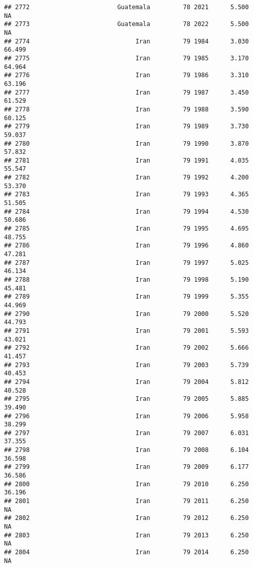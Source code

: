 \documentclass[
]{article}
\begin{document}
\begin{verbatim}
## 2772                        Guatemala         78 2021      5.500         NA
## 2773                        Guatemala         78 2022      5.500         NA
## 2774                             Iran         79 1984      3.030     66.499
## 2775                             Iran         79 1985      3.170     64.964
## 2776                             Iran         79 1986      3.310     63.196
## 2777                             Iran         79 1987      3.450     61.529
## 2778                             Iran         79 1988      3.590     60.125
## 2779                             Iran         79 1989      3.730     59.037
## 2780                             Iran         79 1990      3.870     57.832
## 2781                             Iran         79 1991      4.035     55.547
## 2782                             Iran         79 1992      4.200     53.370
## 2783                             Iran         79 1993      4.365     51.505
## 2784                             Iran         79 1994      4.530     50.686
## 2785                             Iran         79 1995      4.695     48.755
## 2786                             Iran         79 1996      4.860     47.281
## 2787                             Iran         79 1997      5.025     46.134
## 2788                             Iran         79 1998      5.190     45.481
## 2789                             Iran         79 1999      5.355     44.969
## 2790                             Iran         79 2000      5.520     44.793
## 2791                             Iran         79 2001      5.593     43.021
## 2792                             Iran         79 2002      5.666     41.457
## 2793                             Iran         79 2003      5.739     40.453
## 2794                             Iran         79 2004      5.812     40.528
## 2795                             Iran         79 2005      5.885     39.490
## 2796                             Iran         79 2006      5.958     38.299
## 2797                             Iran         79 2007      6.031     37.355
## 2798                             Iran         79 2008      6.104     36.598
## 2799                             Iran         79 2009      6.177     36.586
## 2800                             Iran         79 2010      6.250     36.196
## 2801                             Iran         79 2011      6.250         NA
## 2802                             Iran         79 2012      6.250         NA
## 2803                             Iran         79 2013      6.250         NA
## 2804                             Iran         79 2014      6.250         NA

\end{verbatim}
\end{document}
